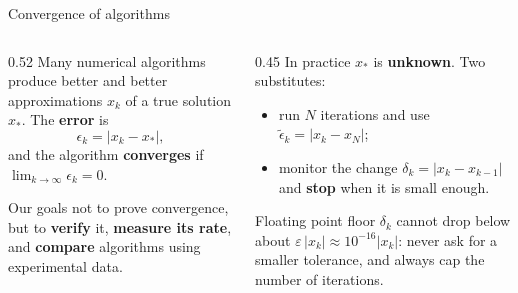 \documentclass[aspectratio=169]{beamer}
\begin{document}
\begin{frame}{Convergence of algorithms}
\begin{columns}[T]
\begin{column}{0.52\textwidth}
\small
Many numerical algorithms produce better and better approximations $x_k$ of a true solution $x_\ast$. The \textbf{error} is
\[
\epsilon_k = |x_k - x_\ast| ,
\]
and the algorithm \textbf{converges} if $\displaystyle\lim_{k\to\infty} \epsilon_k = 0$.
\vspace{0.1cm}
\begin{block}{Our goals}
not to prove convergence, but to \textbf{verify} it, \textbf{measure its rate}, and \textbf{compare} algorithms using experimental data.
\end{block}
\end{column}
\begin{column}{0.45\textwidth}
\small
In practice $x_\ast$ is \textbf{unknown}. Two substitutes:
\begin{itemize}
  \item run $N$ iterations and use $\tilde\epsilon_k = |x_k - x_N|$;
  \item monitor the change $\delta_k = |x_k - x_{k-1}|$ and \textbf{stop} when it is small enough.
\end{itemize}
\vspace{0.1cm}
\begin{alertblock}{Floating point floor}
\scriptsize $\delta_k$ cannot drop below about $\varepsilon\,|x_k| \approx 10^{-16}|x_k|$: never ask for a smaller tolerance, and always cap the number of iterations.
\end{alertblock}
\end{column}
\end{columns}
\end{frame}
\end{document}
